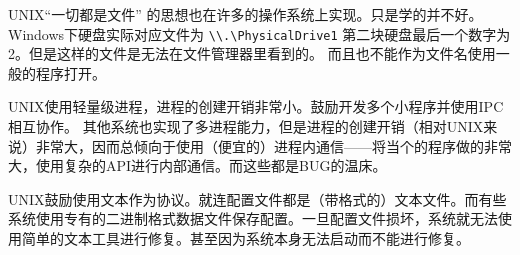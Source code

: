 
UNIX“一切都是文件” 的思想也在许多的操作系统上实现。只是学的并不好。Windows下硬盘实际对应文件为 \texttt{\textbackslash\textbackslash.\textbackslash{}PhysicalDrive1} 第二块硬盘最后一个数字为2。但是这样的文件是无法在文件管理器里看到的。
而且也不能作为文件名使用一般的程序打开。

UNIX使用轻量级进程，进程的创建开销非常小。鼓励开发多个小程序并使用IPC相互协作。
其他系统也实现了多进程能力，但是进程的创建开销（相对UNIX来说）非常大，因而总倾向于使用（便宜的）进程内通信------将当个的程序做的非常大，使用复杂的API进行内部通信。而这些都是BUG的温床。

UNIX鼓励使用文本作为协议。就连配置文件都是（带格式的）文本文件。而有些系统使用专有的二进制格式数据文件保存配置。一旦配置文件损坏，系统就无法使用简单的文本工具进行修复。甚至因为系统本身无法启动而不能进行修复。
